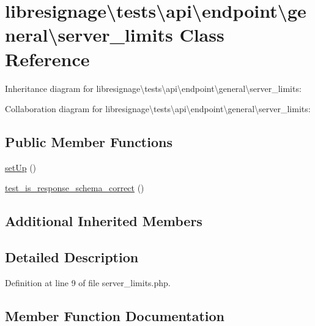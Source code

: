\hypertarget{classlibresignage_1_1tests_1_1api_1_1endpoint_1_1general_1_1server__limits}{}\section{libresignage\textbackslash{}tests\textbackslash{}api\textbackslash{}endpoint\textbackslash{}general\textbackslash{}server\+\_\+limits Class Reference}
\label{classlibresignage_1_1tests_1_1api_1_1endpoint_1_1general_1_1server__limits}


Inheritance diagram for libresignage\textbackslash{}tests\textbackslash{}api\textbackslash{}endpoint\textbackslash{}general\textbackslash{}server\+\_\+limits\+:


Collaboration diagram for libresignage\textbackslash{}tests\textbackslash{}api\textbackslash{}endpoint\textbackslash{}general\textbackslash{}server\+\_\+limits\+:
\subsection*{Public Member Functions}
\begin{DoxyCompactItemize}
\item 
\hyperlink{classlibresignage_1_1tests_1_1api_1_1endpoint_1_1general_1_1server__limits_abf6dee497abfd3d6b7e72ad51215e8f4}{set\+Up} ()
\item 
\hyperlink{classlibresignage_1_1tests_1_1api_1_1endpoint_1_1general_1_1server__limits_ad39f78e6fa03143e26123e3c86bfdf32}{test\+\_\+is\+\_\+response\+\_\+schema\+\_\+correct} ()
\end{DoxyCompactItemize}
\subsection*{Additional Inherited Members}


\subsection{Detailed Description}


Definition at line 9 of file server\+\_\+limits.\+php.



\subsection{Member Function Documentation}
\mbox{\label{classlibresignage_1_1tests_1_1api_1_1endpoint_1_1general_1_1server__limits_abf6dee497abfd3d6b7e72ad51215e8f4}} 

